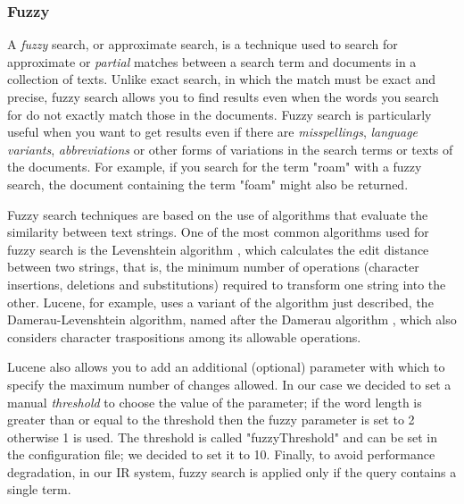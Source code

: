 \subsubsection{Fuzzy}
\label{subsubsec:fuzzy}


A \emph{fuzzy} search, or approximate search, is a technique used to search for approximate or \emph{partial} matches between a search term and documents in a collection of texts. Unlike exact search, in which the match must be exact and precise, fuzzy search allows you to find results even when the words you search for do not exactly match those in the documents.
Fuzzy search is particularly useful when you want to get results even if there are \emph{misspellings}, \emph{language variants}, \emph{abbreviations} or other forms of variations in the search terms or texts of the documents. For example, if you search for the term "roam" with a fuzzy search, the document containing the term "foam" might also be returned.

Fuzzy search techniques are based on the use of algorithms that evaluate the similarity between text strings. One of the most common algorithms used for fuzzy search is the Levenshtein algorithm \citep{levenshtein1966binary}, which calculates the edit distance between two strings, that is, the minimum number of operations (character insertions, deletions and substitutions) required to transform one string into the other. Lucene, for example, uses a variant of the algorithm just described, the Damerau-Levenshtein algorithm, named after the Damerau algorithm \citep{damerau1964technique}, which also considers character traspositions among its allowable operations.

Lucene also allows you to add an additional (optional) parameter with which to specify the maximum number of changes allowed. In our case we decided to set a manual \emph{threshold} to choose the value of the parameter; if the word length is greater than or equal to the threshold then the fuzzy parameter is set to 2 otherwise 1 is used. The threshold is called "fuzzyThreshold" and can be set in the configuration file; we decided to set it to 10.
Finally, to avoid performance degradation, in our IR system, fuzzy search is applied only if the query contains a single term.
